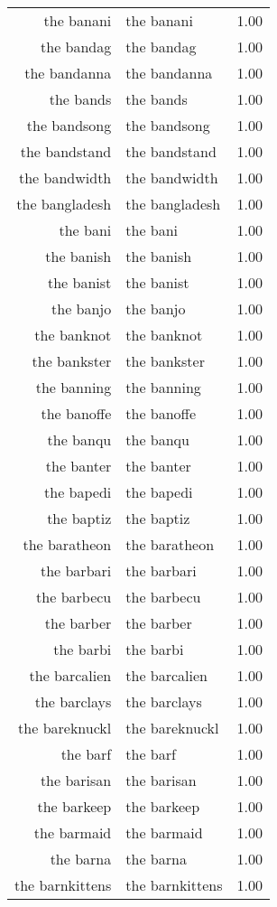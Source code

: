 \begin{table}[ht]
\begin{tabular}{rlr}
  the banani & the banani & 1.00 \\ 
  the bandag & the bandag & 1.00 \\ 
  the bandanna & the bandanna & 1.00 \\ 
  the bands & the bands & 1.00 \\ 
  the bandsong & the bandsong & 1.00 \\ 
  the bandstand & the bandstand & 1.00 \\ 
  the bandwidth & the bandwidth & 1.00 \\ 
  the bangladesh & the bangladesh & 1.00 \\ 
  the bani & the bani & 1.00 \\ 
  the banish & the banish & 1.00 \\ 
  the banist & the banist & 1.00 \\ 
  the banjo & the banjo & 1.00 \\ 
  the banknot & the banknot & 1.00 \\ 
  the bankster & the bankster & 1.00 \\ 
  the banning & the banning & 1.00 \\ 
  the banoffe & the banoffe & 1.00 \\ 
  the banqu & the banqu & 1.00 \\ 
  the banter & the banter & 1.00 \\ 
  the bapedi & the bapedi & 1.00 \\ 
  the baptiz & the baptiz & 1.00 \\ 
  the baratheon & the baratheon & 1.00 \\ 
  the barbari & the barbari & 1.00 \\ 
  the barbecu & the barbecu & 1.00 \\ 
  the barber & the barber & 1.00 \\ 
  the barbi & the barbi & 1.00 \\ 
  the barcalien & the barcalien & 1.00 \\ 
  the barclays & the barclays & 1.00 \\ 
  the bareknuckl & the bareknuckl & 1.00 \\ 
  the barf & the barf & 1.00 \\ 
  the barisan & the barisan & 1.00 \\ 
  the barkeep & the barkeep & 1.00 \\ 
  the barmaid & the barmaid & 1.00 \\ 
  the barna & the barna & 1.00 \\ 
  the barnkittens & the barnkittens & 1.00 \\ 

\end{tabular}
\end{table}
